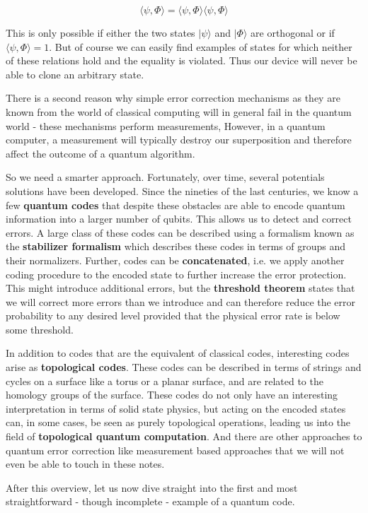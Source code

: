 \documentclass[a4paper, draft]{article}
\theoremstyle{own}
\theoremstyle{remark}
\begin{document}
$$
\langle \psi, \Phi \rangle   = \langle \psi, \Phi \rangle \langle \psi, \Phi \rangle
$$

This is only possible if either the two states $|\psi \rangle$ and $|\Phi \rangle$ are orthogonal or if $\langle \psi, \Phi \rangle = 1$. But of course we can easily find examples of states for which neither of these relations hold and the equality is violated. Thus our device will never be able to clone an arbitrary state. 

There is a second reason why simple error correction mechanisms as they are known from the world of classical computing will in general fail in the quantum world - these mechanisms perform measurements, However, in a quantum computer, a measurement will typically destroy our superposition and therefore affect the outcome of a quantum algorithm. 

So we need a smarter approach. Fortunately, over time, several potentials solutions have been developed. Since the nineties of the last centuries, we know a few {\bf quantum codes} that despite these obstacles are able to encode quantum information into a larger number of qubits. This allows us to detect and correct errors. A large class of these codes can be described using a formalism known as the {\bf stabilizer formalism} which describes these codes in terms of groups and their normalizers. Further, codes can be {\bf concatenated}, i.e. we apply another coding procedure to the encoded state to further increase the error protection. This might introduce additional errors, but the {\bf threshold theorem} states that we will correct more errors than we introduce and can therefore reduce the error probability to any desired level provided that the physical error rate is below some threshold.

In addition to codes that are the equivalent of classical codes, interesting codes arise as {\bf topological codes}. These codes can be described in terms of strings and cycles on a surface like a torus or a planar surface, and are related to the homology groups of the surface. These codes do not only have an interesting interpretation in terms of solid state physics, but acting on the encoded states can, in some cases, be seen as purely topological operations, leading us into the field of {\bf topological quantum computation}. And there are other approaches to quantum error correction like measurement based approaches that we will not even be able to touch in these notes.

After this overview, let us now dive straight into the first and most straightforward - though incomplete - example of a quantum code. 
\end{document}
